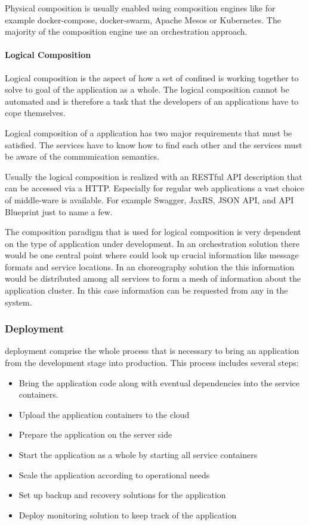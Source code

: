 Physical composition is usually enabled using composition engines like for
example docker-compose, docker-swarm, Apache Mesos or Kubernetes. The majority
of the composition engine use an orchestration approach. 

\paragraph{Logical Composition}

Logical composition is the aspect of how a set of confined \ms{} is working
together to solve to goal of the application as a whole. The logical composition
cannot be automated and is therefore a task that the developers of an
applications have to cope themselves. 

Logical composition of a \ms{} application has two major requirements that must
be satisfied. The services have to know how to find each other and the services
must be aware of the communication semantics. 

Usually the logical composition is realized with an RESTful API description that
can be accessed via a HTTP. Especially for regular web applications a vast
choice of middle-ware is available. For example Swagger, JaxRS, JSON API, and
API Blueprint just to name a few.

The composition paradigm that is used for logical composition is very dependent
on the type of application under development. In an orchestration solution there
would be one central point where \mss{} could look up crucial information like
message formats and service locations. In an choreography solution the this
information would be distributed among all services to form a mesh of
information about the application cluster. In this case information can be
requested from any \ms{} in the system.

\subsubsection{\ms{} Deployment}

\ms{} deployment comprise the whole process that is necessary to bring an application
from the development stage into production. This process includes several steps: 

\begin{itemize}
  \item Bring the application code along with eventual dependencies into the
  service containers.
  \item Upload the application containers to the cloud
  \item Prepare the application on the server side
  \item Start the application as a whole by starting all service containers
  \item Scale the application according to operational needs
  \item Set up backup and recovery solutions for the application
  \item Deploy monitoring solution to keep track of the application
\end{itemize}


